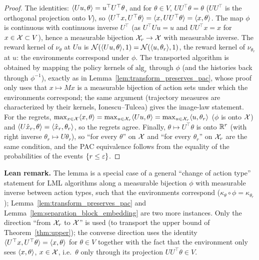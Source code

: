 \begin{proof}
The identities: $\langle Uu, \theta \rangle = u^\top U^\top\theta$, and for $\theta \in V$,
$UU^\top\theta = \theta$ ($UU^\top$ is the orthogonal projection onto $V$), so
$\langle U^\top x, U^\top\theta \rangle = \langle x, UU^\top\theta \rangle = \langle x, \theta \rangle$. The map $\phi$ is
continuous with continuous inverse $U^\top$ (as $U^\top Uu = u$ and $UU^\top x = x$ for
$x \in \mathcal{X} \subset V$), hence a measurable bijection $\mathcal{X}_r \to \mathcal{X}$ with measurable
inverse. The reward kernel of $\nu_\theta$ at $Uu$ is $\mathcal{N}(\langle Uu, \theta \rangle,1)
= \mathcal{N}(\langle u, \theta_r \rangle,1)$, the reward kernel of $\nu_{\theta_r}$ at $u$: the
environments correspond under $\phi$. The transported algorithm is obtained by mapping the
policy kernels of $\mathrm{alg}_r$ through $\phi$ (and the histories back through
$\phi^{-1}$), exactly as in Lemma~\ref{lem:transform_preserves_pac}, whose proof only uses
that $x \mapsto Mx$ is a measurable bijection of action sets under which the environments
correspond; the same argument (trajectory measures are characterized by their kernels,
Ionescu--Tulcea) gives the image-law statement. For the regrets,
$\max_{x\in\mathcal{X}}\langle x, \theta \rangle = \max_{u\in\mathcal{X}_r}\langle Uu, \theta \rangle = \max_{u\in\mathcal{X}_r}\langle u, \theta_r \rangle$
($\phi$ is onto $\mathcal{X}$) and $\langle U\hat{x}_r, \theta \rangle = \langle \hat{x}_r, \theta_r \rangle$, so the regrets
agree. Finally, $\theta \mapsto U^\top\theta$ is onto $\mathbb{R}^r$ (with right inverse
$\theta_r \mapsto U\theta_r$), so ``for every $\theta$'' on $\mathcal{X}$ and ``for every $\theta_r$''
on $\mathcal{X}_r$ are the same condition, and the PAC equivalence follows from the equality of the
probabilities of the events $\{r \le \varepsilon\}$.
\end{proof}

\textbf{Lean remark.} The lemma is a special case of a general ``change of action type''
statement for LML algorithms along a measurable bijection $\phi$ with measurable inverse
between action types, such that the environments correspond
($\kappa_\theta \circ \phi = \kappa_{\theta_r}$); Lemma~\ref{lem:transform_preserves_pac} and
Lemma~\ref{lem:separation_block_embedding} are two more instances. Only the direction
``from $\mathcal{X}_r$ to $\mathcal{X}$'' is used (to transport the upper bound of Theorem~\ref{thm:upper});
the converse direction uses the identity $\langle U^\top x, U^\top\theta \rangle = \langle x, \theta \rangle$ for
$\theta \in V$ together with the fact that the environment only sees $\langle x, \theta \rangle$,
$x \in \mathcal{X}$, i.e.\ $\theta$ only through its projection $UU^\top\theta \in V$.

